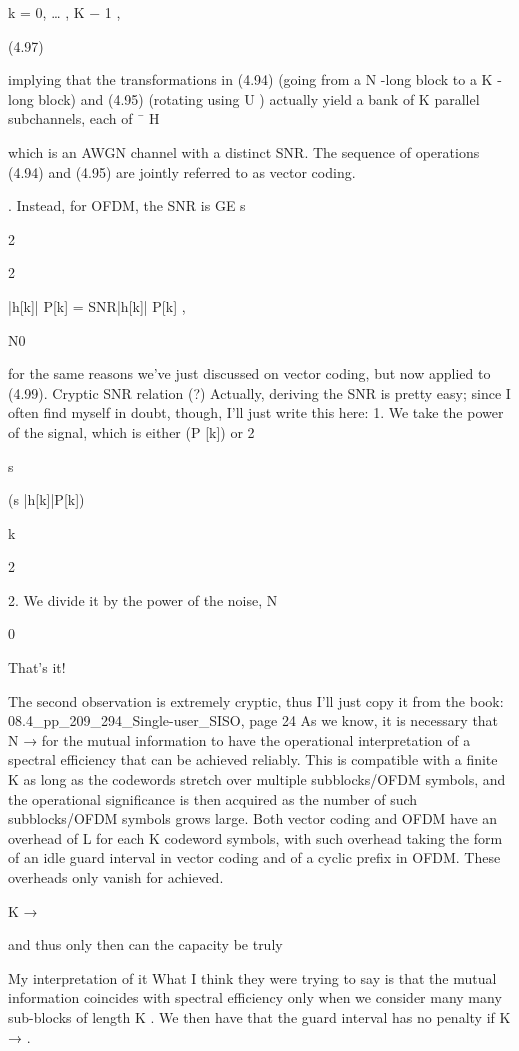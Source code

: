 {{{{{k = 0, … , K − 1 ,

(4.97)

implying that the transformations in (4.94) (going from a N -long block to a K -long block)
and (4.95) (rotating using U ) actually yield a bank of K parallel subchannels, each of
¯
H

which is an AWGN channel with a distinct SNR.
The sequence of operations (4.94) and (4.95) are jointly referred to as vector coding.

. Instead, for OFDM, the SNR is GE s

2

2

|h[k]| P[k] = SNR|h[k]| P[k] ,

N0

for the same reasons we've just discussed on vector coding, but now applied to (4.99).
​Cryptic SNR relation (?)
Actually, deriving the SNR is pretty easy; since I often find myself in doubt, though,
I'll just write this here:
1. We take the power of the signal, which is either (\sqrtGE {} P [k]) or 2

s

(\sqrtGE s |h[k]|\sqrt P[k])

k

2

2. We divide it by the power of the noise, N

0

That's it!

The second observation is extremely cryptic, thus I'll just copy it from the book:
08.4_pp_209_294_Single-user_SISO, page 24 As we know, it is necessary that N → \infty for the mutual information to have the operational interpretation of a spectral efficiency that can be achieved reliably. This is compatible with a finite K as long as the codewords stretch over multiple subblocks/OFDM symbols, and the operational significance is then acquired as the number of such subblocks/OFDM symbols grows large. Both vector coding and OFDM have an overhead of L for each K codeword symbols, with such overhead taking the form of an idle guard interval in vector coding and of a cyclic prefix in OFDM. These overheads only vanish for achieved.

K → \infty

and thus only then can the capacity be truly

​My interpretation of it What I think they were trying to say is that the mutual information coincides with spectral efficiency only when we consider many many sub-blocks of length K . We then have that the guard interval has no penalty if K → \infty.

}}}}}
